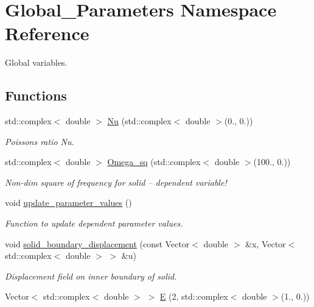 \hypertarget{namespaceGlobal__Parameters}{}\section{Global\+\_\+\+Parameters Namespace Reference}
\label{namespaceGlobal__Parameters}


Global variables.  


\subsection*{Functions}
\begin{DoxyCompactItemize}
\item 
std\+::complex$<$ double $>$ \hyperlink{namespaceGlobal__Parameters_a373950a959cd784c8f8028099807c2fb}{Nu} (std\+::complex$<$ double $>$(0., 0.))
\begin{DoxyCompactList}\small\item\em Poisson\textquotesingle{}s ratio Nu. \end{DoxyCompactList}\item 
std\+::complex$<$ double $>$ \hyperlink{namespaceGlobal__Parameters_a91314f7f1cc80c43543948568f50f405}{Omega\+\_\+sq} (std\+::complex$<$ double $>$(100., 0.))
\begin{DoxyCompactList}\small\item\em Non-\/dim square of frequency for solid -- dependent variable! \end{DoxyCompactList}\item 
void \hyperlink{namespaceGlobal__Parameters_ae0f9a80fb7510dbfbbef22582da231b7}{update\+\_\+parameter\+\_\+values} ()
\begin{DoxyCompactList}\small\item\em Function to update dependent parameter values. \end{DoxyCompactList}\item 
void \hyperlink{namespaceGlobal__Parameters_ab51fa55d06d9963d363bcf966cfcc62b}{solid\+\_\+boundary\+\_\+displacement} (const Vector$<$ double $>$ \&x, Vector$<$ std\+::complex$<$ double $>$ $>$ \&u)
\begin{DoxyCompactList}\small\item\em Displacement field on inner boundary of solid. \end{DoxyCompactList}\item 
Vector$<$ std\+::complex$<$ double $>$ $>$ \hyperlink{namespaceGlobal__Parameters_aa961bcca2115ce9cb37cc8ccb1b90cae}{E} (2, std\+::complex$<$ double $>$(1., 0.))

\end{DoxyCompactItemize}
